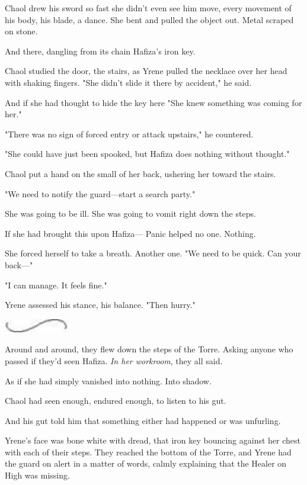Chaol drew his sword so fast she didn't even see him move, every movement of his body, his blade, a dance. She bent and pulled the object out. Metal scraped on stone.

And there, dangling from its chain  Hafiza's iron key.

Chaol studied the door, the stairs, as Yrene pulled the necklace over her head with shaking fingers. "She didn't slide it there by accident," he said.

And if she had thought to hide the key here  "She knew something was coming for her."

"There was no sign of forced entry or attack upstairs," he countered.

"She could have just been spooked, but  Hafiza does nothing without thought."

Chaol put a hand on the small of her back, ushering her toward the stairs.

"We need to notify the guard---start a search party."

She was going to be ill. She was going to vomit right down the steps.

If she had brought this upon Hafiza--- Panic helped no one. Nothing.

She forced herself to take a breath. Another one. "We need to be quick. Can your back---"

"I can manage. It feels fine."

Yrene assessed his stance, his balance. "Then hurry."

\includegraphics[width=1.12in,height=0.24in]{images/seperator}

Around and around, they flew down the steps of the Torre. Asking anyone who passed if they'd seen Hafiza. \emph{In her workroom}, they all said.

As if she had simply vanished into nothing. Into shadow.

Chaol had seen enough, endured enough, to listen to his gut.

And his gut told him that something either had happened or was unfurling.

Yrene's face was bone white with dread, that iron key bouncing against her chest with each of their steps. They reached the bottom of the Torre, and Yrene had the guard on alert in a matter of words, calmly explaining that the Healer on High was missing.

